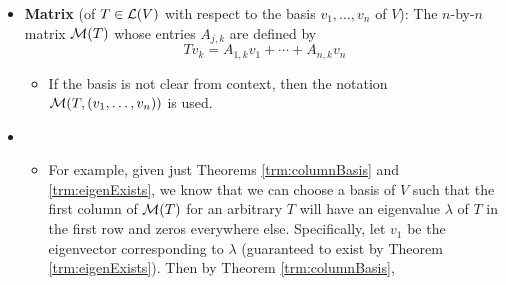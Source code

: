 \documentclass[../main.tex]{subfiles}
\begin{document}
\begin{itemize}
\begin{theorem}
\begin{proof}
\begin{equation*}
            \end{equation*}
            for all $z\in\C$, where $c\in\C$ is nonzero and each $\lambda_j\in\C$\footnote{Note that $m\neq n$ necessarily, because $a_n$ may equal 0.}. It follows that
            \begin{align*}
                0 &= a_0v+a_1Tv+\cdots+a_nT^nv\\
                &= (a_0I+a_1T+\cdots+a_nT^n)v\\
                &= c(T-\lambda_1I)\cdots(T-\lambda_mI)v\tag*{Theorem \ref{trm:polTMultiplicative}}
            \end{align*}
            Each $T-\lambda_jI$ is a linear operator in its own right. As a linear map, we have by Theorem \ref{trm:linSendsZero} that $(T-\lambda_jI)0=0$ for all $j=1,\dots,m$. However, $v\neq 0$, meaning that there exists $1\leq k\leq m$ such that $T-\lambda_kI$ maps its nonzero argument, which we may call $v'$ and know to be the result of all of the operators to its right being applied successively to $v$ via function composition, to 0 as well; every operator to the left of $T-\lambda_kI$ will then map the result to 0, resulting in the final equivalence. Thus, $(T-\lambda_kI)v'=(T-\lambda_kI)0$ but $v'\neq 0$ for this operator, meaning that it is not injective. But if $T-\lambda_kI$ is not injective, Theorem \ref{trm:eigenConditions} implies that $\lambda_k$ is an eigenvalue of $T$, as desired.
        \end{proof}
    \end{theorem}
    \item \textbf{Matrix} (of $T\in\mathcal{L}(V)$ with respect to the basis $v_1,\dots,v_n$ of $V$): The $n$-by-$n$ matrix $\mathcal{M}(T)$ whose entries $A_{j,k}$ are defined by
    \begin{equation*}
        Tv_k = A_{1,k}v_1+\cdots+A_{n,k}v_n
    \end{equation*}
    \begin{itemize}
        \item If the basis is not clear from context, then the notation $\mathcal{M}(T,(v_1,\dots,v_n))$ is used.
    \end{itemize}
    \item {}
    \begin{itemize}
        \item For example, given just Theorems \ref{trm:columnBasis} and \ref{trm:eigenExists}, we know that we can choose a basis of $V$ such that the first column of $\mathcal{M}(T)$ for an arbitrary $T$ will have an eigenvalue $\lambda$ of $T$ in the first row and zeros everywhere else. Specifically, let $v_1$ be the eigenvector corresponding to $\lambda$ (guaranteed to exist by Theorem \ref{trm:eigenExists}). Then by Theorem \ref{trm:columnBasis},

\end{itemize}
\end{itemize}
\end{document}
